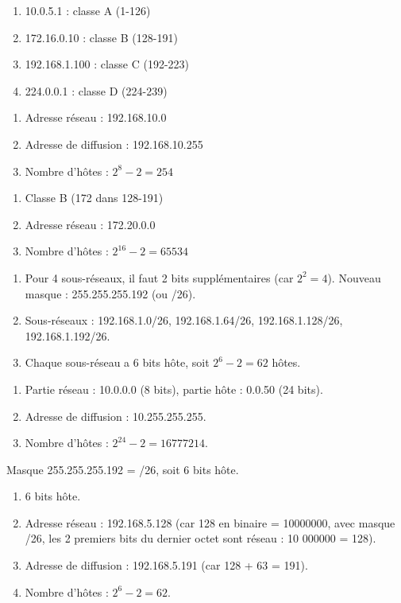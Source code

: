 \begin{enumerate}
    \item 10.0.5.1 : classe A (1-126)
    \item 172.16.0.10 : classe B (128-191)
    \item 192.168.1.100 : classe C (192-223)
    \item 224.0.0.1 : classe D (224-239)
\end{enumerate}

\begin{enumerate}
    \item Adresse réseau : 192.168.10.0
    \item Adresse de diffusion : 192.168.10.255
    \item Nombre d'hôtes : $2^8 - 2 = 254$
\end{enumerate}

\begin{enumerate}
    \item Classe B (172 dans 128-191)
    \item Adresse réseau : 172.20.0.0
    \item Nombre d'hôtes : $2^{16} - 2 = 65 534$
\end{enumerate}

\begin{enumerate}
    \item Pour 4 sous-réseaux, il faut 2 bits supplémentaires (car $2^2 = 4$). Nouveau masque : 255.255.255.192 (ou /26).
    \item Sous-réseaux : 192.168.1.0/26, 192.168.1.64/26, 192.168.1.128/26, 192.168.1.192/26.
    \item Chaque sous-réseau a 6 bits hôte, soit $2^6 - 2 = 62$ hôtes.
\end{enumerate}

\begin{enumerate}
    \item Partie réseau : 10.0.0.0 (8 bits), partie hôte : 0.0.50 (24 bits).
    \item Adresse de diffusion : 10.255.255.255.
    \item Nombre d'hôtes : $2^{24} - 2 = 16 777 214$.
\end{enumerate}

Masque 255.255.255.192 = /26, soit 6 bits hôte.
\begin{enumerate}
    \item 6 bits hôte.
    \item Adresse réseau : 192.168.5.128 (car 128 en binaire = 10000000, avec masque /26, les 2 premiers bits du dernier octet sont réseau : 10 000000 = 128).
    \item Adresse de diffusion : 192.168.5.191 (car 128 + 63 = 191).
    \item Nombre d'hôtes : $2^6 - 2 = 62$.
\end{enumerate}

